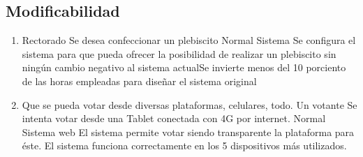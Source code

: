 \subsection{Modificabilidad}


\begin{enumerate}
 
\item  {}
{Rectorado}
{Se desea confeccionar un plebiscito}
{Normal}
{Sistema}
{Se configura el sistema para que pueda ofrecer la posibilidad de realizar un plebiscito sin ning\'un cambio negativo al sistema actual}{Se invierte menos del 10 porciento de las horas empleadas para diseñar el sistema original}

\medskip
\item \escenario
{Que se pueda votar desde diversas plataformas, celulares, todo.}
{Un votante}
{Se intenta votar desde una Tablet conectada con 4G por internet.}
{Normal}
{Sistema web}
{El sistema permite votar siendo transparente la plataforma para \'este.}
{El sistema funciona correctamente en los 5 dispositivos m\'as utilizados.}



\end{enumerate}
